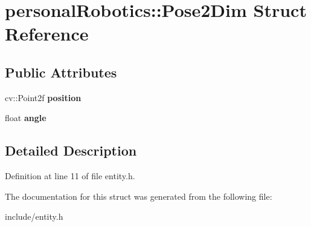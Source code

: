 \hypertarget{structpersonal_robotics_1_1_pose2_dim}{}\section{personal\+Robotics\+:\+:Pose2\+Dim Struct Reference}
\label{structpersonal_robotics_1_1_pose2_dim}
\subsection*{Public Attributes}
\begin{DoxyCompactItemize}
\item 
\hypertarget{structpersonal_robotics_1_1_pose2_dim_aed9dde2eb1c4b6459918862e443d577a}{}cv\+::\+Point2f {\bfseries position}\label{structpersonal_robotics_1_1_pose2_dim_aed9dde2eb1c4b6459918862e443d577a}

\item 
\hypertarget{structpersonal_robotics_1_1_pose2_dim_a7d807be04fa678f9e4204e549512d709}{}float {\bfseries angle}\label{structpersonal_robotics_1_1_pose2_dim_a7d807be04fa678f9e4204e549512d709}

\end{DoxyCompactItemize}


\subsection{Detailed Description}


Definition at line 11 of file entity.\+h.



The documentation for this struct was generated from the following file\+:\begin{DoxyCompactItemize}
\item 
include/entity.\+h\end{DoxyCompactItemize}

